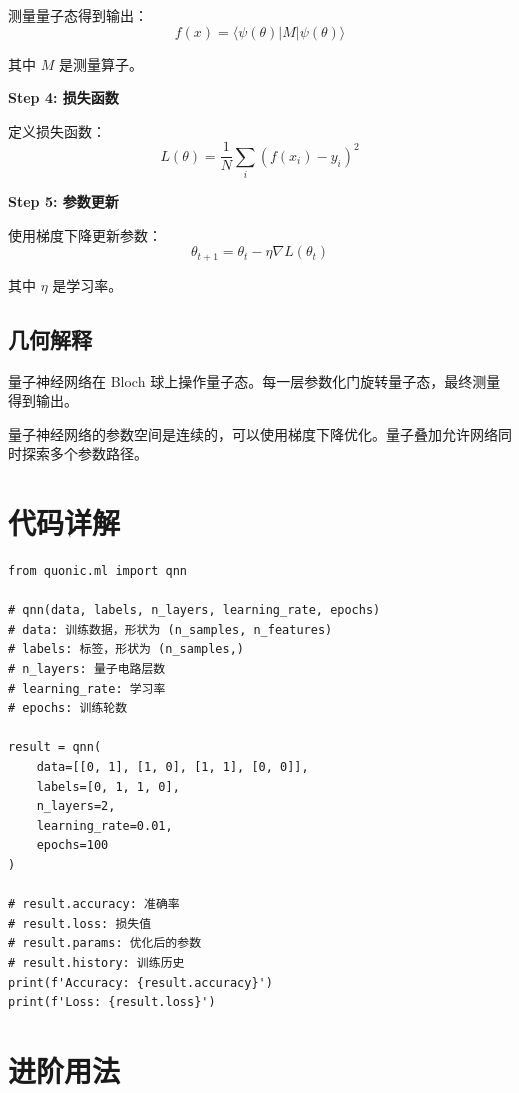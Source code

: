 \documentclass[12pt,a4paper]{article}
\begin{document}
测量量子态得到输出：
\begin{equation}
f(x) = \langle\psi(\theta)|M|\psi(\theta)\rangle
\end{equation}

其中 $M$ 是测量算子。

\textbf{Step 4: 损失函数}

定义损失函数：
\begin{equation}
L(\theta) = \frac{1}{N} \sum_i (f(x_i) - y_i)^2
\end{equation}

\textbf{Step 5: 参数更新}

使用梯度下降更新参数：
\begin{equation}
\theta_{t+1} = \theta_t - \eta \nabla L(\theta_t)
\end{equation}

其中 $\eta$ 是学习率。

\subsection{几何解释}

量子神经网络在 Bloch 球上操作量子态。每一层参数化门旋转量子态，最终测量得到输出。

量子神经网络的参数空间是连续的，可以使用梯度下降优化。量子叠加允许网络同时探索多个参数路径。

\section{代码详解}

\begin{verbatim}
from quonic.ml import qnn

# qnn(data, labels, n_layers, learning_rate, epochs)
# data: 训练数据，形状为 (n_samples, n_features)
# labels: 标签，形状为 (n_samples,)
# n_layers: 量子电路层数
# learning_rate: 学习率
# epochs: 训练轮数

result = qnn(
    data=[[0, 1], [1, 0], [1, 1], [0, 0]],
    labels=[0, 1, 1, 0],
    n_layers=2,
    learning_rate=0.01,
    epochs=100
)

# result.accuracy: 准确率
# result.loss: 损失值
# result.params: 优化后的参数
# result.history: 训练历史
print(f'Accuracy: {result.accuracy}')
print(f'Loss: {result.loss}')
\end{verbatim}

\section{进阶用法}
\end{document}
